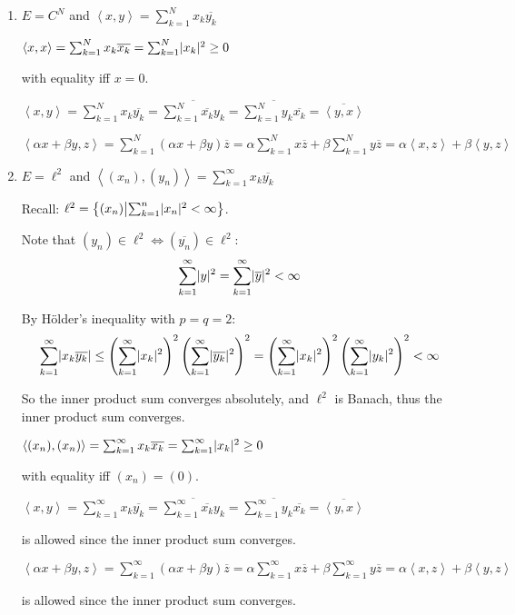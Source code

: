 \documentclass[letterpaper,12pt,fleqn]{article}
\newcommand{\inner}[2]{\left<#1,#2\right>}
\newcommand{\conj}[1]{\overline{#1}}
\renewcommand{\a}{\alpha}
\renewcommand{\b}{\beta}
\begin{document}
\begin{examples}
  \listbreak
  \begin{enumerate}
  \item $E=C^N$ and $\inner{x}{y}=\sum_{k=1}^Nx_k\conj{y_k}$

    $\inner{x}{x}=\sum_{k=1}^Nx_k\conj{x_k}=\sum_{k=1}^N\abs{x_k}^2\ge0$

    with equality iff $x=0$.

    $\inner{x}{y}=\sum_{k=1}^Nx_k\conj{y_k}=
    \conj{\sum_{k=1}^N\conj{x_k}y_k}=\conj{\sum_{k=1}^Ny_k\conj{x_k}}=
    \conj{\inner{y}{x}}$

    $\inner{\a x+\b y}{z}=\sum_{k=1}^N(\a x+\b y)\conj{z}=
    \a\sum_{k=1}^Nx\conj{z}+\b\sum_{k=1}^Ny\conj{z}=
    \a\inner{x}{z}+\b\inner{y}{z}$

  \item $E=\ell^2$ and $\inner{(x_n)}{(y_n)}=\sum_{k=1}^{\infty}x_k\conj{y_k}$

    Recall: $\ell^2=\left\{(x_n)\middle|\sum_{k=1}^n\lvert x_n\rvert^2<\infty\right\}$.

    Note that $(y_n)\in\ell^2\iff(\conj{y_n})\in\ell^2$:
    \[\sum_{k=1}^{\infty}\abs{y}^2=\sum_{k=1}^{\infty}\abs{\conj{y}}^2<\infty\]

    By H\"{o}lder's inequality with $p=q=2$:
    \[\sum_{k=1}^{\infty}\abs{x_k\conj{y_k}}\le
    \left(\sum_{k=1}^{\infty}\abs{x_k}^2\right)^2
    \left(\sum_{k=1}^{\infty}\abs{\conj{y_k}}^2\right)^2=
    \left(\sum_{k=1}^{\infty}\abs{x_k}^2\right)^2
    \left(\sum_{k=1}^{\infty}\abs{y_k}^2\right)^2<\infty\]

    So the inner product sum converges absolutely, and $\ell^2$ is Banach,
    thus the inner product sum converges.

    $\inner{(x_n)}{(x_n)}=
    \sum_{k=1}^{\infty}x_k\conj{x_k}=\sum_{k=1}^{\infty}\abs{x_k}^2\ge0$

    with equality iff $(x_n)=(0)$.

    $\inner{x}{y}=\sum_{k=1}^{\infty}x_k\conj{y_k}=
    \conj{\sum_{k=1}^{\infty}\conj{x_k}y_k}=
    \conj{\sum_{k=1}^{\infty}y_k\conj{x_k}}=\conj{\inner{y}{x}}$

    is allowed since the inner product sum converges.

    $\inner{\a x+\b y}{z}=\sum_{k=1}^{\infty}(\a x+\b y)\conj{z}=
    \a\sum_{k=1}^{\infty}x\conj{z}+\b\sum_{k=1}^{\infty}y\conj{z}=
    \a\inner{x}{z}+\b\inner{y}{z}$

    is allowed since the inner product sum converges.


\end{enumerate}
\end{examples}
\end{document}
